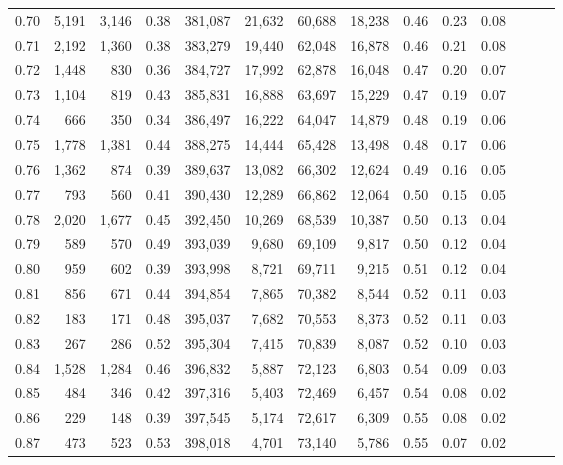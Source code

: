 \begin{tabular}{rrrrrrrrrrrrrr}
0.70 &   5,191 &  3,146 &  0.38 &  381,087 &   21,632 &  60,688 &  18,238 &  0.46 &  0.23 &      0.08 \\
0.71 &   2,192 &  1,360 &  0.38 &  383,279 &   19,440 &  62,048 &  16,878 &  0.46 &  0.21 &      0.08 \\
0.72 &   1,448 &    830 &  0.36 &  384,727 &   17,992 &  62,878 &  16,048 &  0.47 &  0.20 &      0.07 \\
0.73 &   1,104 &    819 &  0.43 &  385,831 &   16,888 &  63,697 &  15,229 &  0.47 &  0.19 &      0.07 \\
0.74 &     666 &    350 &  0.34 &  386,497 &   16,222 &  64,047 &  14,879 &  0.48 &  0.19 &      0.06 \\
0.75 &   1,778 &  1,381 &  0.44 &  388,275 &   14,444 &  65,428 &  13,498 &  0.48 &  0.17 &      0.06 \\
0.76 &   1,362 &    874 &  0.39 &  389,637 &   13,082 &  66,302 &  12,624 &  0.49 &  0.16 &      0.05 \\
0.77 &     793 &    560 &  0.41 &  390,430 &   12,289 &  66,862 &  12,064 &  0.50 &  0.15 &      0.05 \\
0.78 &   2,020 &  1,677 &  0.45 &  392,450 &   10,269 &  68,539 &  10,387 &  0.50 &  0.13 &      0.04 \\
0.79 &     589 &    570 &  0.49 &  393,039 &    9,680 &  69,109 &   9,817 &  0.50 &  0.12 &      0.04 \\
0.80 &     959 &    602 &  0.39 &  393,998 &    8,721 &  69,711 &   9,215 &  0.51 &  0.12 &      0.04 \\
0.81 &     856 &    671 &  0.44 &  394,854 &    7,865 &  70,382 &   8,544 &  0.52 &  0.11 &      0.03 \\
0.82 &     183 &    171 &  0.48 &  395,037 &    7,682 &  70,553 &   8,373 &  0.52 &  0.11 &      0.03 \\
0.83 &     267 &    286 &  0.52 &  395,304 &    7,415 &  70,839 &   8,087 &  0.52 &  0.10 &      0.03 \\
0.84 &   1,528 &  1,284 &  0.46 &  396,832 &    5,887 &  72,123 &   6,803 &  0.54 &  0.09 &      0.03 \\
0.85 &     484 &    346 &  0.42 &  397,316 &    5,403 &  72,469 &   6,457 &  0.54 &  0.08 &      0.02 \\
0.86 &     229 &    148 &  0.39 &  397,545 &    5,174 &  72,617 &   6,309 &  0.55 &  0.08 &      0.02 \\
0.87 &     473 &    523 &  0.53 &  398,018 &    4,701 &  73,140 &   5,786 &  0.55 &  0.07 &      0.02 \\

\end{tabular}
